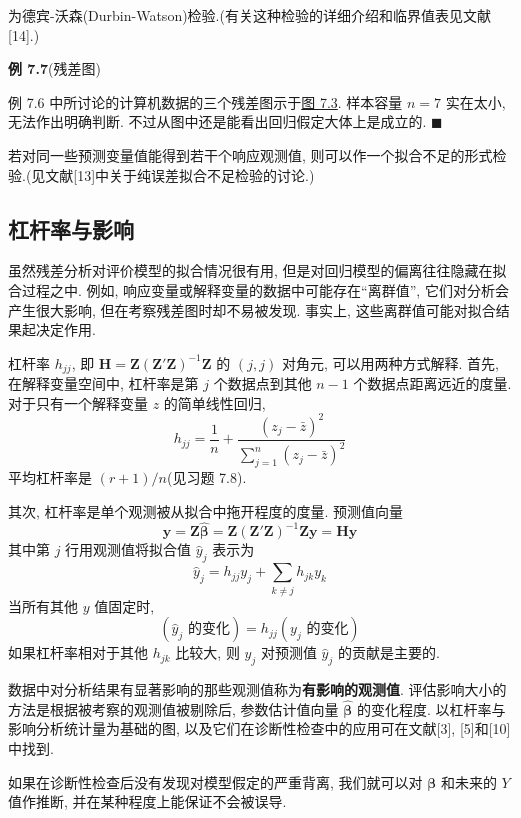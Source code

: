 
为德宾-沃森(Durbin-Watson)检验.(有关这种检验的详细介绍和临界值表见文献[14].)

\noindent\textbf{例 7.7}\quad (残差图)

例 7.6 中所讨论的计算机数据的三个残差图示于\hyperref[fig:7.3]{图 7.3}. 样本容量 $n=7$ 实在太小, 无法作出明确判断. 不过从图中还是能看出回归假定大体上是成立的. \hfill$\blacksquare$

\begin{mvfigure}
\label{fig:7.3}
\end{mvfigure}

若对同一些预测变量值能得到若干个响应观测值, 则可以作一个拟合不足的形式检验.(见文献[13]中关于纯误差拟合不足检验的讨论.)

\subsection{杠杆率与影响}

虽然残差分析对评价模型的拟合情况很有用, 但是对回归模型的偏离往往隐藏在拟合过程之中. 例如, 响应变量或解释变量的数据中可能存在``离群值'', 它们对分析会产生很大影响, 但在考察残差图时却不易被发现. 事实上, 这些离群值可能对拟合结果起决定作用.

杠杆率 $h_{jj}$, 即 $\mathbf{H}=\mathbf{Z}(\mathbf{Z}'\mathbf{Z})^{-1}\mathbf{Z}$ 的 $(j,j)$ 对角元, 可以用两种方式解释. 首先, 在解释变量空间中, 杠杆率是第 $j$ 个数据点到其他 $n-1$ 个数据点距离远近的度量. 对于只有一个解释变量 $z$ 的简单线性回归,
\[
h_{jj}=\frac{1}{n}+\frac{(z_j-\bar{z})^2}{\sum\limits_{j=1}^{n}(z_j-\bar{z})^2}
\]
平均杠杆率是 $(r+1)/n$(见习题 7.8).

其次, 杠杆率是单个观测被从拟合中拖开程度的度量. 预测值向量
\[
\hat{\mathbf{y}}=\mathbf{Z}\hat{\boldsymbol{\beta}}=\mathbf{Z}(\mathbf{Z}'\mathbf{Z})^{-1}\mathbf{Z}\mathbf{y}=\mathbf{H}\mathbf{y}
\]
其中第 $j$ 行用观测值将拟合值 $\hat{y}_j$ 表示为
\[
\hat{y}_j=h_{jj}y_j+\sum_{k\neq j}h_{jk}y_k
\]
当所有其他 $y$ 值固定时,
\[
(\hat{y}_j\text{ 的变化})=h_{jj}(y_j\text{ 的变化})
\]
如果杠杆率相对于其他 $h_{jk}$ 比较大, 则 $y_j$ 对预测值 $\hat{y}_j$ 的贡献是主要的.

数据中对分析结果有显著影响的那些观测值称为\textbf{有影响的观测值}. 评估影响大小的方法是根据被考察的观测值被剔除后, 参数估计值向量 $\hat{\boldsymbol{\beta}}$ 的变化程度. 以杠杆率与影响分析统计量为基础的图, 以及它们在诊断性检查中的应用可在文献[3], [5]和[10]中找到.

如果在诊断性检查后没有发现对模型假定的严重背离, 我们就可以对 $\boldsymbol{\beta}$ 和未来的 $Y$ 值作推断, 并在某种程度上能保证不会被误导.

